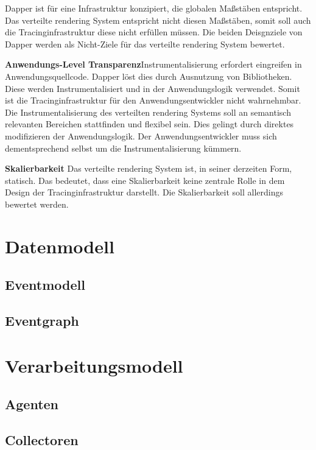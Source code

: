 Dapper ist für eine Infrastruktur konzipiert, die globalen  Maßstäben entspricht. Das verteilte rendering System entspricht nicht diesen Maßstäben, somit soll auch die Tracinginfrastruktur diese nicht erfüllen müssen. Die beiden Deisgnziele von Dapper werden als Nicht-Ziele für das verteilte rendering System bewertet.

\textbf{Anwendungs-Level Transparenz}\space\space\space Instrumentalisierung erfordert eingreifen in Anwendungsquellcode. Dapper löst dies durch Ausnutzung von Bibliotheken. Diese werden Instrumentalisiert und in der Anwendungslogik verwendet. Somit ist die Tracinginfrastruktur für den Anwendungsentwickler nicht wahrnehmbar. Die Instrumentalisierung des verteilten rendering Systems soll an semantisch relevanten Bereichen stattfinden und flexibel sein. Dies gelingt durch direktes modifizieren der Anwendungslogik. Der Anwendungsentwickler muss sich dementsprechend selbst um die Instrumentalisierung kümmern. 

\textbf{Skalierbarkeit} \space\space\space Das verteilte rendering System ist, in seiner derzeiten Form, statisch. Das bedeutet, dass eine Skalierbarkeit keine zentrale Rolle in dem Design der Tracinginfrastruktur darstellt. Die Skalierbarkeit soll allerdings bewertet werden. 

\section{Datenmodell}
\label{section:Datenmodell}
\subsection{Eventmodell}
\label{subsection:Eventmodell}
\subsection{Eventgraph}
\label{subsection:Eventgraph}
\section{Verarbeitungsmodell}
\label{section:Verarbeitungsmodell}
\subsection{Agenten}
\label{subsection:Agenten}
\subsection{Collectoren}
\label{subsection:Collectoren}

